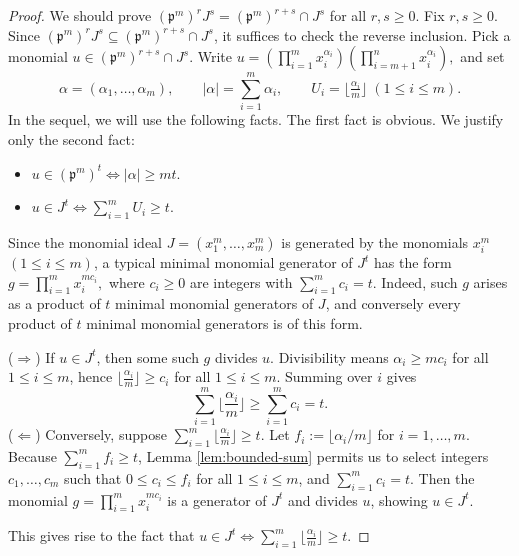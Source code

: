 \documentclass[11pt]{amsart}
\begin{document}
\begin{proof}
We should prove  $(\mathfrak{p}^m)^r J^s = (\mathfrak{p}^m)^{r+s} \cap J^s$ for all $r,s\geq 0$. Fix $r,s\geq 0$. Since $(\mathfrak{p}^m)^r J^s \subseteq  (\mathfrak{p}^m)^{r+s} \cap J^s$, it suffices to check the reverse inclusion. Pick a monomial $u\in (\mathfrak{p}^m)^{r+s} \cap J^s$. 
  Write $u =(\prod_{i=1}^mx_i^{\alpha_i})(\prod_{i=m+1}^nx_i^{\alpha_i}),$ and set 
\[
\alpha = (\alpha_1,\dots,\alpha_m), \qquad
|\alpha| = \sum_{i=1}^m \alpha_i, \qquad
U_i = \Big\lfloor \tfrac{\alpha_i}{m} \Big\rfloor \; (1\leq i \leq m).
\]
In the sequel, we will use the following facts. The first fact is obvious. We  justify only the second fact:
\begin{itemize}
    \item $u \in (\mathfrak{p}^m)^t \iff |\alpha| \ge mt$. 
    \item $u \in J^t \iff \sum_{i=1}^m U_i \ge t$.
\end{itemize}

\medskip
Since the monomial  ideal $J=(x_1^m,\dots,x_m^m)$ is generated by the monomials $x_i^m$ $(1\leq i \leq m)$, a typical minimal monomial generator of $J^t$ has the form
 $g = \prod_{i=1}^m x_i^{m c_i},$ where $c_i \ge 0$ are integers with $\sum_{i=1}^m c_i = t$.  
Indeed, such $g$ arises as a product of $t$ minimal monomial generators of $J$, and conversely every product of $t$ minimal monomial generators is of this form.

\smallskip
\noindent ($\Rightarrow$) If $u \in J^t$, then some such $g$ divides $u$.  Divisibility means $\alpha_i \ge m c_i$ for all $1\leq i \leq m$, hence
 $\Big\lfloor \frac{\alpha_i}{m} \Big\rfloor \ge c_i$   for all $1\leq i \leq m$.  Summing over $i$ gives
$$\sum_{i=1}^m \Big\lfloor \frac{\alpha_i}{m} \Big\rfloor \ge \sum_{i=1}^m c_i = t.$$
\noindent ($\Leftarrow$) Conversely, suppose $\sum_{i=1}^m \Big\lfloor \tfrac{\alpha_i}{m} \Big\rfloor \ge t.$
Let $f_i := \lfloor \alpha_i / m \rfloor$ for $i=1, \ldots, m$. 
Because  $\sum_{i=1}^m f_i \ge t$,  Lemma \ref{lem:bounded-sum} permits  us to select  integers $c_1, \ldots, c_m$ such that  $0 \le c_i \le f_i$  for all $1\leq i \leq m$,  and $\sum_{i=1}^m c_i = t$. Then the monomial $g = \prod_{i=1}^m x_i^{m c_i}$ is a generator of $J^t$ and divides $u$, showing $u \in J^t$.

 This gives rise to the fact that $u \in J^t \iff  \sum_{i=1}^m \Big\lfloor \frac{\alpha_i}{m} \Big\rfloor \ge t.$


\end{proof}
\end{document}
